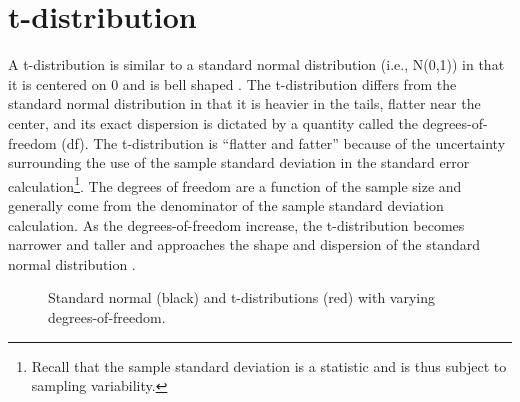 \documentclass[10pt,openany]{book}\usepackage[]{graphicx}\usepackage[]{color}
\newenvironment{knitrout}{}{} %
\begin{document}
\section{t-distribution}\label{sect:tDist}
A t-distribution is similar to a standard normal distribution (i.e., N(0,1)) in that it is centered on 0 and is bell shaped .  The t-distribution differs from the standard normal distribution in that it is heavier in the tails, flatter near the center, and its exact dispersion is dictated by a quantity called the degrees-of-freedom (df).  The t-distribution is ``flatter and fatter'' because of the uncertainty surrounding the use of the sample standard deviation in the standard error calculation\footnote{Recall that the sample standard deviation is a statistic and is thus subject to sampling variability.}.  The degrees of freedom are a function of the sample size and generally come from the denominator of the sample standard deviation calculation.  As the degrees-of-freedom increase, the t-distribution becomes narrower and taller and approaches the shape and dispersion of the standard normal distribution .

\begin{knitrout}
\color{fgcolor}




























\begin{figure}[hbtp]

{\centering {}

}

\caption[Standard normal (black) and t-distributions (red) with varying degrees-of-freedom]{Standard normal (black) and t-distributions (red) with varying degrees-of-freedom.}\label{fig:tvsZ}
\end{figure}


\end{knitrout}
\end{document}
